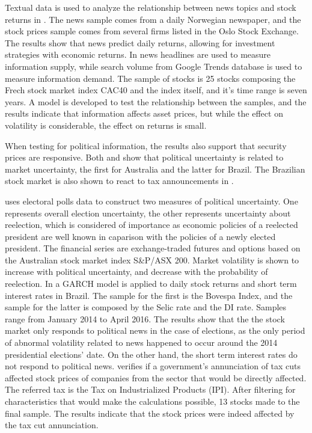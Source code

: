 \documentclass[cic,tc, english]{iiufrgs}
\begin{document}
    Textual data is used to analyze the relationship between news topics and stock returns in \citet{larsenthorsrud2017}. The news sample comes from a daily Norwegian newspaper, and the stock prices sample comes from several firms listed in the Oslo Stock Exchange. The results show that news predict daily returns, allowing for investment strategies with economic returns.
    In \citet{moussaetal2017} news headlines are used to measure information supply, while search volume from Google Trends database is used to measure information demand. The sample of stocks is 25 stocks composing the Frech stock market index CAC40 and the index itself, and it's time range is seven years. A model is developed to test the relationship between the samples, and the results indicate that information affects asset prices, but while the effect on volatility is considerable, the effect on returns is small.

    When testing for political information, the results also support that security prices are responsive. Both \citet{smales2015} and \citet{marquessantos2016} show that political uncertainty is related to market uncertainty, the first for Australia and the latter for Brazil. The Brazilian stock market is also shown to react to tax announcements in \citet{gabrielribeiro2013}.

    \citet{smales2015} uses electoral polls data to construct two measures of political uncertainty. One represents overall election uncertainty, the other represents uncertainty about reelection, which is considered of importance as economic policies of a reelected president are well known in caparison with the policies of a newly elected president. The financial series are exchange-traded futures and options based on the Australian stock market index S\&P/ASX 200. Market volatility is shown to increase with political uncertainty, and decrease with the probability of reelection.
    In \citet{marquessantos2016} a GARCH model is applied to daily stock returns and short term interest rates in Brazil. The sample for the first is the Bovespa Index, and the sample for the latter is composed by the Selic rate and the DI rate. Samples range from January 2014 to April 2016. The results show that the the stock market only responds to political news in the case of elections, as the only period of abnormal volatility related to news happened to occur around the 2014 presidential elections' date. On the other hand, the short term interest rates do not respond to political news.
    \citet{gabrielribeiro2013} verifies if a government's annunciation of tax cuts affected stock prices of companies from the sector that would be directly affected. The referred tax is the Tax on Industrialized Products (IPI). After filtering for characteristics that would make the calculations possible, 13 stocks made to the final sample. The results indicate that the stock prices were indeed affected by the tax cut annunciation.
\end{document}
